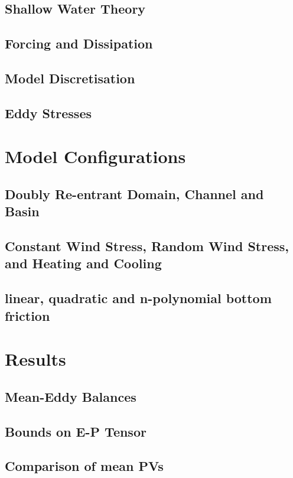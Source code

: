 \documentclass[10pt,a4paper]{article}
\begin{document}
\subsection{Shallow Water Theory}

\subsection{Forcing and Dissipation}

\subsection{Model Discretisation}

\subsection{Eddy Stresses}

\section{Model Configurations}

\subsection{Doubly Re-entrant Domain, Channel and Basin}

\subsection{Constant Wind Stress, Random Wind Stress, and Heating and Cooling}

\subsection{linear, quadratic and n-polynomial bottom friction}

\section{Results}

\subsection{Mean-Eddy Balances}

\subsection{Bounds on E-P Tensor}

\subsection{Comparison of mean PVs}
\end{document}
